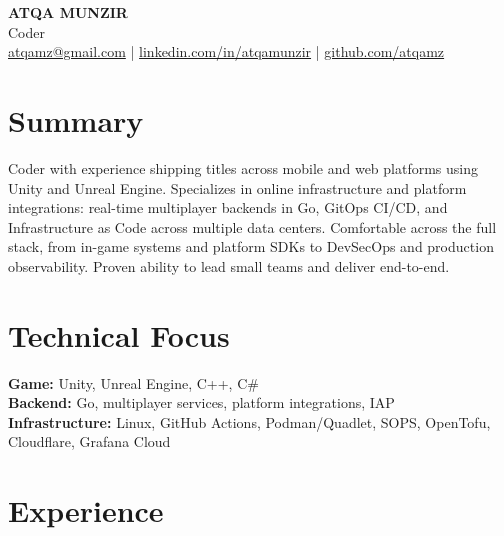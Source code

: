 \documentclass[10pt,a4paper]{article}
\newcommand{\contactsep}{\hspace{0.55em}\textcolor{muted}{|}\hspace{0.55em}}
\begin{document}
\small

\begin{center}
  {\LARGE\bfseries ATQA MUNZIR}\\[0.2em]
  {\normalsize Coder}\\[0.3em]
  \href{mailto:atqamz@gmail.com}{atqamz@gmail.com}
  \contactsep
  \href{https://linkedin.com/in/atqamunzir}{linkedin.com/in/atqamunzir}
  \contactsep
  \href{https://github.com/atqamz}{github.com/atqamz}
\end{center}
\vspace{-0.4em}

\section*{Summary}
Coder with experience shipping titles across mobile and web platforms using Unity and Unreal Engine. Specializes in online infrastructure and platform integrations: real-time multiplayer backends in Go, GitOps CI/CD, and Infrastructure as Code across multiple data centers. Comfortable across the full stack, from in-game systems and platform SDKs to DevSecOps and production observability. Proven ability to lead small teams and deliver end-to-end.

\section*{Technical Focus}
\textbf{Game:} Unity, Unreal Engine, C++, C\#\\
\textbf{Backend:} Go, multiplayer services, platform integrations, IAP\\
\textbf{Infrastructure:} Linux, GitHub Actions, Podman/Quadlet, SOPS, OpenTofu, Cloudflare, Grafana Cloud

\section*{Experience}
\end{document}
